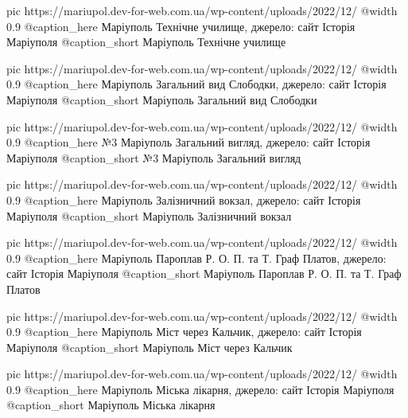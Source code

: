 	pic https://mariupol.dev-for-web.com.ua/wp-content/uploads/2022/12/%
	@width 0.9
	@caption_here Маріуполь Технічне училище, джерело: сайт Історія Маріуполя
	@caption_short Маріуполь Технічне училище

	pic https://mariupol.dev-for-web.com.ua/wp-content/uploads/2022/12/%
	@width 0.9
	@caption_here Маріуполь Загальний вид Слободки, джерело: сайт Історія Маріуполя
	@caption_short Маріуполь Загальний вид Слободки

	pic https://mariupol.dev-for-web.com.ua/wp-content/uploads/2022/12/%
	@width 0.9
	@caption_here №3 Маріуполь Загальний вигляд, джерело: сайт Історія Маріуполя
	@caption_short №3 Маріуполь Загальний вигляд

	pic https://mariupol.dev-for-web.com.ua/wp-content/uploads/2022/12/%
	@width 0.9
	@caption_here Маріуполь Залізничний вокзал, джерело: сайт Історія Маріуполя
	@caption_short Маріуполь Залізничний вокзал

	pic https://mariupol.dev-for-web.com.ua/wp-content/uploads/2022/12/%
	@width 0.9
	@caption_here Маріуполь Пароплав Р. О. П. та Т. Граф Платов, джерело: сайт Історія Маріуполя
	@caption_short Маріуполь Пароплав Р. О. П. та Т. Граф Платов

	pic https://mariupol.dev-for-web.com.ua/wp-content/uploads/2022/12/%
	@width 0.9
	@caption_here Маріуполь Міст через Кальчик, джерело: сайт Історія Маріуполя
	@caption_short Маріуполь Міст через Кальчик

	pic https://mariupol.dev-for-web.com.ua/wp-content/uploads/2022/12/%
	@width 0.9
	@caption_here Маріуполь Міська лікарня, джерело: сайт Історія Маріуполя
	@caption_short Маріуполь Міська лікарня

